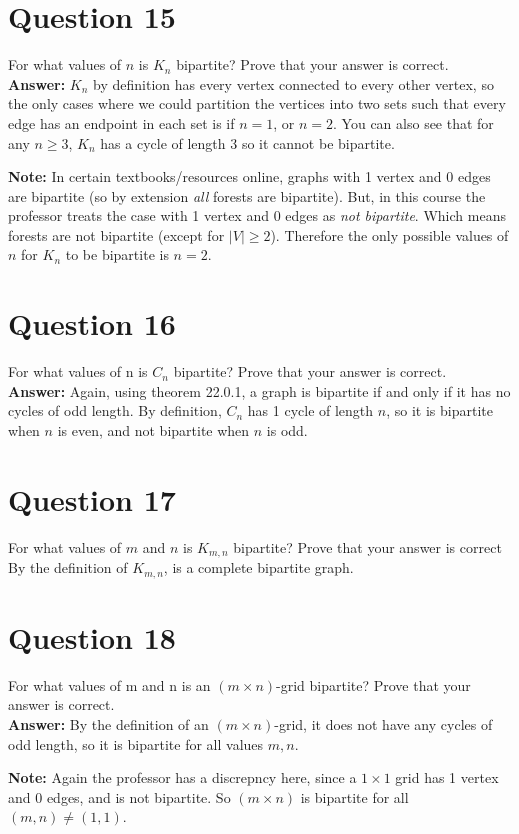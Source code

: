 \documentclass[openany]{report}
\begin{document}
\section{Question 15}
For what values of $n$ is $K_n$ bipartite? Prove that your answer is correct.\\[2ex]
\textbf{Answer:} $K_n$ by definition has every vertex connected to every other vertex, so the only cases where we could partition the vertices into two sets such that every edge has an endpoint in each set is if $n = 1$, or $n = 2$. You can also see that for any $n \geq 3$, $K_n$ has a cycle of length 3 so it cannot be bipartite. 
\begin{center}
    \textbf{Note:} In certain textbooks/resources online, graphs with 1 vertex and 0 edges are bipartite (so by extension \emph{all} forests are bipartite). But, in this course the professor treats the case with 1 vertex and 0 edges as \emph{not bipartite}. Which means forests are not bipartite (except for $|V| \geq 2$). Therefore the only possible values of $n$ for $K_n$ to be bipartite is $n = 2$.  
\end{center}
\section{Question 16}
For what values of n is $C_n$ bipartite? Prove that your answer is correct.\\[2ex]
\textbf{Answer:} Again, using theorem 22.0.1, a graph is bipartite if and only if it has no cycles of odd length. By definition, $C_n$ has 1 cycle of length $n$, so it is bipartite when $n$ is even, and not bipartite when $n$ is odd.
\section{Question 17}
For what values of $m$ and $n$ is $K_{m,n}$ bipartite? Prove that your answer is correct\\[2ex]
By the definition of $K_{m,n}$, is a complete bipartite graph. 
\section{Question 18}
For what values of m and n is an $(m \times n)$-grid bipartite? Prove that your answer is
correct.\\[2ex]
\textbf{Answer:} By the definition of an $(m \times n)$-grid, it does not have any cycles of odd length, so it is bipartite for all values $m,n$.
\begin{center}
    \textbf{Note:} Again the professor has a discrepncy here, since a $1 \times 1$ grid has 1 vertex and 0 edges, and is not bipartite. So $(m\times n)$ is bipartite for all $(m,n) \neq (1,1)$.
\end{center}
\end{document}
